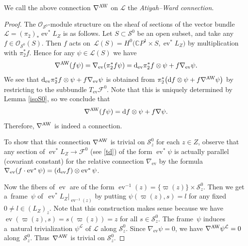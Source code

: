 \documentclass[pdftex]{sigma}
\numberwithin{equation}{section}
\theoremstyle{definition}
\newcommand\C{{\mathbb C}}
\begin{document}
We call the above connection $\nabla^{\rm AW}$ on $\mathcal L$ the \emph{Atiyah--Ward connection}.

\begin{proof}
The $\mathcal O_{\mathcal S^0}$-module structure on the sheaf of sections of the
vector bundle $\mathcal L = (\pi_2)_*\operatorname{ev}^*L_Z$ is as follows. Let $S \subset
\mathcal S^0$ be an open subset, and take any $f \in \mathcal O_{\mathcal S^0}(S)$.
Then $f$ acts on~${\mathcal L(S) = H^0\bigl(\C P^1\times S, \operatorname{ev}^*L_Z\bigr)}$ by multiplication
with $\pi_2^*f$. Hence for any $\psi \in \mathcal L(S)$ we have
\[
\nabla^{\rm AW}(f\psi) =
\nabla_{\operatorname{ev}}(\pi_2^*f\psi) = {\rm d}_{\operatorname{ev}}\pi_2^*f\otimes\psi +
f\nabla_{\operatorname{ev}}\psi.
\]
We see that ${\rm d}_{\operatorname{ev}}\pi_2^*f\otimes\psi + f\nabla_{\operatorname{ev}}\psi$ is obtained from
$\pi_2^*\bigl({\rm d}f\otimes\psi + f\nabla^{\rm AW}\psi\bigr)$ by restricting to the subbundle
$T_{\operatorname{ev}}\mathcal F^0$. Note that this is uniquely determined by
Lemma \ref{isoS0}, so we conclude that{\samepage
\[
\nabla^{\rm AW}(f\psi) = {\rm d}f\otimes\psi + f\nabla\psi.
\]
Therefore, $\nabla^{\rm AW}$ is indeed a connection.}

To show that this connection $\nabla^{\rm AW}$ is trivial on $\mathcal{S}_z^0$ for each $z \in Z$, observe
that any section of $\operatorname{ev}^* L_Z \longrightarrow {\mathcal F}^0$ (see \eqref{td}) of the form
$\operatorname{ev}^*\psi$ is actually parallel
(covariant constant) for the relative connection
$\nabla_{\operatorname{ev}}$ by the formula
$\nabla_{\operatorname{ev}}(f\cdot\operatorname{ev}^*\psi) =
({\rm d}_{\operatorname{ev}}f)\otimes\operatorname{ev}^*\psi $.

Now the fibers of $\operatorname{ev}$ are of the form
$
\operatorname{ev}^{-1}(z) = \{\varpi(z)\}\times\mathcal S_z^0$.
Then we get a~frame~$\psi$ of~$\operatorname{ev}^*L_Z|_{\operatorname{ev}^{-1}(z)}$ by putting
$
\psi(\varpi(z), s) = l
$
for any fixed $0 \neq l \in (L_Z)_z$.
Note that this construction makes sense because we have
$\operatorname{ev}(\varpi(z),s) = s(\varpi(z)) = z$ for all $s \in
\mathcal S_z^0$. The frame~$\psi$ induces a~natural trivialization $\psi^{\mathcal L}$ of
$\mathcal L$ along $\mathcal S_z^0$. Since $\nabla_{\operatorname{ev}}\psi = 0$, we have $\nabla^{\rm AW}
\psi^{\mathcal L} = 0$ along~$\mathcal S_z^0$. Thus~$\nabla^{\rm AW}$ is trivial on $\mathcal S_z^0$.


\end{proof}
\end{document}

